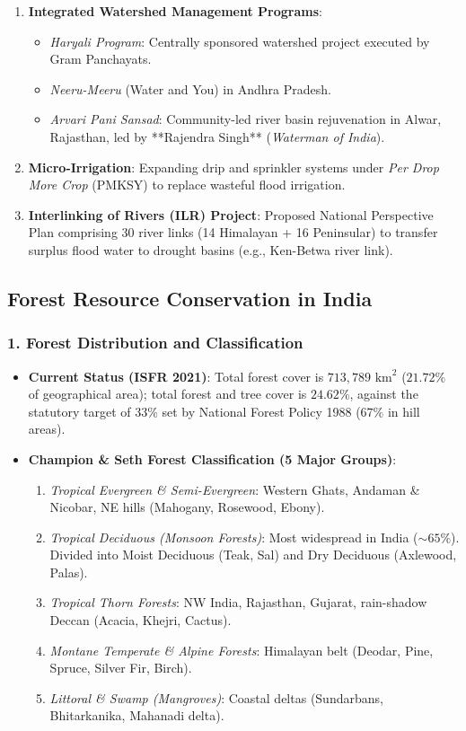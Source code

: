 \documentclass[11pt,a4paper]{article}
\begin{document}
\begin{enumerate}[leftmargin=*]
  \item \textbf{Integrated Watershed Management Programs}:
  \begin{itemize}
    \item \textit{Haryali Program}: Centrally sponsored watershed project executed by Gram Panchayats.
    \item \textit{Neeru-Meeru} (Water and You) in Andhra Pradesh.
    \item \textit{Arvari Pani Sansad}: Community-led river basin rejuvenation in Alwar, Rajasthan, led by **Rajendra Singh** (\textit{Waterman of India}).
  \end{itemize}

  \item \textbf{Micro-Irrigation}: Expanding drip and sprinkler systems under \textit{Per Drop More Crop} (PMKSY) to replace wasteful flood irrigation.
  \item \textbf{Interlinking of Rivers (ILR) Project}: Proposed National Perspective Plan comprising 30 river links (14 Himalayan + 16 Peninsular) to transfer surplus flood water to drought basins (e.g., Ken-Betwa river link).
\end{enumerate}

\subsection{Forest Resource Conservation in India}

\subsubsection{1. Forest Distribution and Classification}
\begin{itemize}[leftmargin=*]
  \item \textbf{Current Status (ISFR 2021)}: Total forest cover is $713,789 \text{ km}^2$ ($21.72\%$ of geographical area); total forest and tree cover is $24.62\%$, against the statutory target of $33\%$ set by National Forest Policy 1988 ($67\%$ in hill areas).
  \item \textbf{Champion \& Seth Forest Classification (5 Major Groups)}:
  \begin{enumerate}
    \item \textit{Tropical Evergreen \& Semi-Evergreen}: Western Ghats, Andaman \& Nicobar, NE hills (Mahogany, Rosewood, Ebony).
    \item \textit{Tropical Deciduous (Monsoon Forests)}: Most widespread in India ($\sim 65\%$). Divided into Moist Deciduous (Teak, Sal) and Dry Deciduous (Axlewood, Palas).
    \item \textit{Tropical Thorn Forests}: NW India, Rajasthan, Gujarat, rain-shadow Deccan (Acacia, Khejri, Cactus).
    \item \textit{Montane Temperate \& Alpine Forests}: Himalayan belt (Deodar, Pine, Spruce, Silver Fir, Birch).
    \item \textit{Littoral \& Swamp (Mangroves)}: Coastal deltas (Sundarbans, Bhitarkanika, Mahanadi delta).
  \end{enumerate}
\end{itemize}
\end{document}
